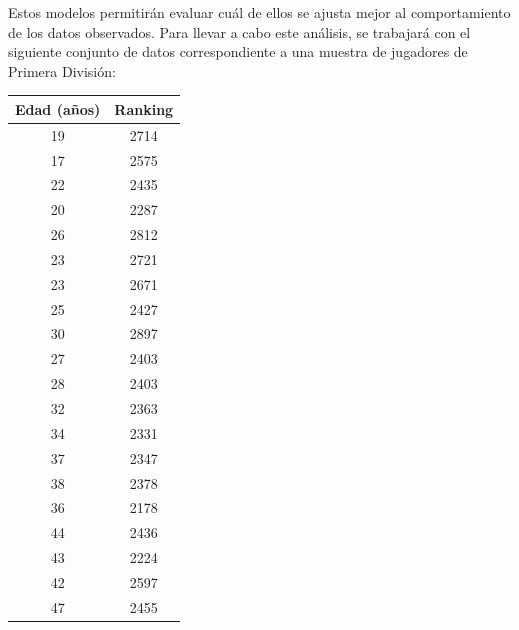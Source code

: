 \documentclass[12pt]{article}
\begin{document}
    Estos modelos permitirán evaluar cuál de ellos se ajusta mejor al comportamiento de los datos observados. Para llevar a cabo este análisis, se trabajará con el siguiente conjunto de datos correspondiente a una muestra de jugadores de Primera División:

    \vspace{1.5cm}

    \begin{center}
        \begin{tabular}{|c|c|}
            \hline
                \textbf{Edad (años)} & \textbf{Ranking} \\
            \hline
            19 & 2714 \\
            17 & 2575 \\
            22 & 2435 \\
            20 & 2287 \\
            26 & 2812 \\
            23 & 2721 \\
            23 & 2671 \\
            25 & 2427 \\
            30 & 2897 \\
            27 & 2403 \\
            28 & 2403 \\
            32 & 2363 \\
            34 & 2331 \\
            37 & 2347 \\
            38 & 2378 \\
            36 & 2178 \\
            44 & 2436 \\
            43 & 2224 \\
            42 & 2597 \\
            47 & 2455 \\
            \hline
        \end{tabular}
    \end{center}
\end{document}
